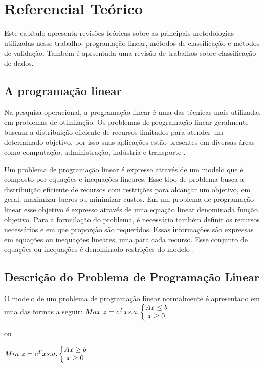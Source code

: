\chapter{Referencial Teórico}

Este capítulo apresenta revisões teóricas sobre as principais metodologias utilizadas nesse trabalho: programação linear, métodos de classificação e métodos de validação. Também é aprsentada uma revisão de trabalhos sobre classificação de dados.  

\section{A programação linear}
Na pesquisa operacional, a programação linear é uma das técnicas mais utilizadas em problemas de otimização. Os problemas de programação linear geralmente buscam a distribuição eficiente de recursos limitados para atender um determinado objetivo, por isso suas aplicações estão presentes em diversas áreas como computação, administração, indústria e transporte \cite{Engecom}.

Um problema de programação linear é expresso através de um modelo que é composto por equações e inequações lineares. Esse tipo de problema busca a distribuição eficiente de recursos com restrições para alcançar um objetivo, em geral, maximizar lucros ou minimizar custos. Em um problema de programação linear esse objetivo é expresso através de uma equação linear denominada função objetivo. Para a formulação do problema, é necessário também definir os recursos necessários e em que proporção são requeridos. Essas informações são expressas em equações ou inequações lineares, uma para cada recurso. Esse conjunto de equações ou inequações é denominado restrições do modelo \cite{Engecom}.

\section{Descrição do Problema de Programação Linear}
O modelo de um problema de programação linear normalmente é apresentado em uma das formas a seguir:
$\\Max\ z = c^{T}x \\\\s.a.\left\{\begin{matrix}
Ax\leq b\\x\geq 0 
\end{matrix}\right.$  

ou  

$\\Min\ z = c^{T}x \\\\s.a.\left\{\begin{matrix}
Ax\geq  b\\x\geq 0 
\end{matrix}\right.$


